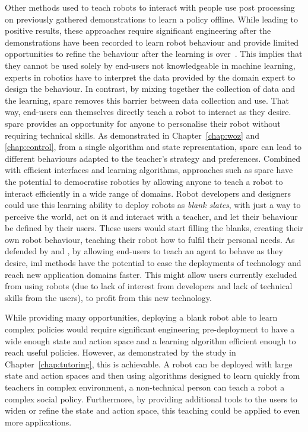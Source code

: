 
Other methods used to teach robots to interact with people use post processing on previously gathered demonstrations to learn a policy offline. While leading to positive results, these approaches require significant engineering after the demonstrations have been recorded to learn robot behaviour and provide limited opportunities to refine the behaviour after the learning is over~\citep{liu2014train,sequeira2016discovering}. This implies that they cannot be used solely by end-users not knowledgeable in machine learning, experts in robotics have to interpret the data provided by the domain expert to design the behaviour. In contrast, by mixing together the collection of data and the learning, \gls{sparc} removes this barrier between data collection and use. That way, end-users can themselves directly teach a robot to interact as they desire.
\gls{sparc} provides an opportunity for anyone to personalise their robot without requiring technical skills. As demonstrated in Chapter~\ref{chap:woz} and \ref{chap:control}, from a single algorithm and state representation, \gls{sparc} can lead to different behaviours adapted to the teacher's strategy and preferences. Combined with efficient interfaces and learning algorithms, approaches such as \gls{sparc} have the potential to democratise robotics by allowing anyone to teach a robot to interact efficiently in a wide range of domains. Robot developers and designers could use this learning ability to deploy robots as \emph{blank slates}, with just a way to perceive the world, act on it and interact with a teacher, and let their behaviour be defined by their users. These users would start filling the blanks, creating their own robot behaviour, teaching their robot how to fulfil their personal needs. As defended by \cite{fails2003interactive} and \cite{amershi2014power}, by allowing end-users to teach an agent to behave as they desire, \gls{iml} methods have the potential to ease the deployments of technology and reach new application domains faster. This might allow users currently excluded from using robots (due to lack of interest from developers and lack of technical skills from the users), to profit from this new technology.

While providing many opportunities, deploying a blank robot able to learn complex policies would require significant engineering pre-deployment to have a wide enough state and action space and a learning algorithm efficient enough to reach useful policies. However, as demonstrated by the study in Chapter~\ref{chap:tutoring}, this is achievable. A robot can be deployed with large state and action spaces and then using algorithms designed to learn quickly from teachers in complex environment, a non-technical person can teach a robot a complex social policy. Furthermore, by providing additional tools to the users to widen or refine the state and action space, this teaching could be applied to even more applications.

